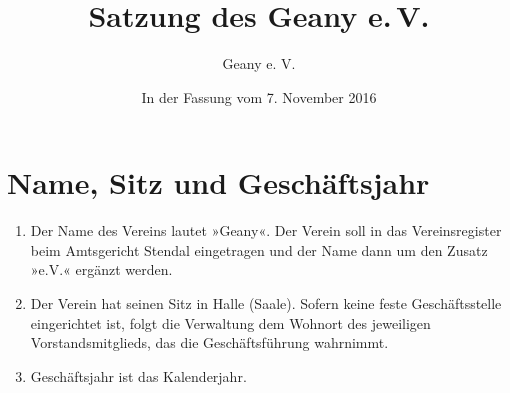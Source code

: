 \documentclass[fontsize=12pt,paper=a4,pagesize,headings=small]{scrartcl}
\title{Satzung des Geany e.\,V.}
\author{Geany e. V.}
\date{In der Fassung vom 7. November 2016}
\begin{document}
\maketitle{}

\section{Name, Sitz und Geschäftsjahr}
\begin{enumerate}
    \item Der Name des Vereins lautet »Geany«. Der Verein soll in das
    Vereinsregister beim Amtsgericht Stendal eingetragen und der Name
    dann um den Zusatz »e.V.« ergänzt werden.

    \item Der Verein hat seinen Sitz in Halle (Saale). Sofern keine
    feste Geschäftsstelle eingerichtet ist, folgt die Verwaltung dem
    Wohnort des jeweiligen Vorstandsmitglieds, das die Geschäftsführung
    wahrnimmt.

    \item Geschäftsjahr ist das Kalenderjahr.
\end{enumerate}
\end{document}
